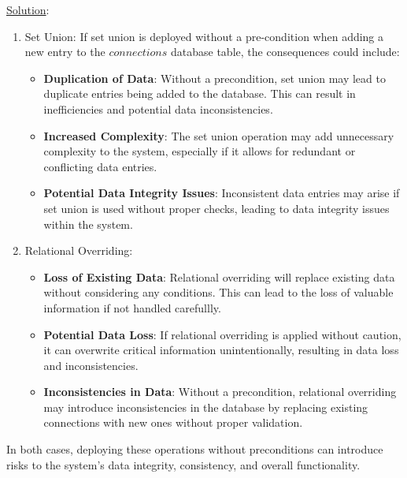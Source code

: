 \documentclass[12pt]{article}
\begin{document}
\begin{spacing}{1.5}
\begin{enumerate}
		      \noindent \underline{Solution}:
		      
		      \begin{enumerate}
		      	\item Set Union:
		      	      If set union is deployed without a pre-condition when adding a new entry to the $connections$ database table, the consequences could include:
		      	      
		      	      \begin{itemize}
		      	      	\item \textbf{Duplication of Data}: Without a precondition, set union may lead to duplicate entries being added to the database. This can result in inefficiencies and potential data inconsistencies.
		      	      	\item \textbf{Increased Complexity}: The set union operation may add unnecessary complexity to the system, especially if it allows for redundant or conflicting data entries.
		      	      	\item \textbf{Potential Data Integrity Issues}: Inconsistent data entries may arise if set union is used without proper checks, leading to data integrity issues within the system.  
		      	      \end{itemize}
		      	      
		      	\item Relational Overriding:
		      	      \begin{itemize}
		      	      	\item \textbf{Loss of Existing Data}: Relational overriding will replace existing data without considering any conditions. This can lead to the loss of valuable information if not handled carefullly.
		      	      	      
		      	      	\item \textbf{Potential Data Loss}: If relational overriding is applied without caution, it can overwrite critical information unintentionally, resulting in data loss and inconsistencies.
		      	      	      
		      	      	\item \textbf{Inconsistencies in Data}: Without a precondition, relational overriding may introduce inconsistencies in the database by replacing existing connections with new ones without proper validation.
		      	      \end{itemize}
		      \end{enumerate}
		      
		      In both cases, deploying these operations without preconditions can introduce risks to the system's data integrity, consistency, and overall functionality.
		               

\end{enumerate}
\end{spacing}
\end{document}
